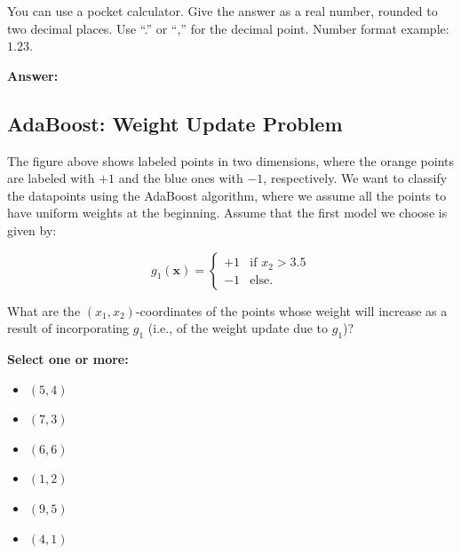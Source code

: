 \documentclass{article}
\begin{document}
You can use a pocket calculator. Give the answer as a real number, rounded to two decimal places. Use ``.'' or ``,'' for the decimal point. Number format example: \(1.23\).

\textbf{Answer:} 

\subsection*{AdaBoost: Weight Update Problem}

\begin{center}
\end{center}

The figure above shows labeled points in two dimensions, where the orange points are labeled with \(+1\) and the blue ones with \(-1\), respectively. We want to classify the datapoints using the AdaBoost algorithm, where we assume all the points to have uniform weights at the beginning. Assume that the first model we choose is given by:

\[
g_1(\mathbf{x}) = 
\begin{cases} 
+1 & \text{if } x_2 > 3.5 \\ 
-1 & \text{else.}
\end{cases}
\]

What are the \((x_1, x_2)\)-coordinates of the points whose weight will increase as a result of incorporating \(g_1\) (i.e., of the weight update due to \(g_1\))?

\textbf{Select one or more:}

\begin{itemize}
    \item \((5, 4)\)
    \item \((7, 3)\)
    \item \((6, 6)\)
    \item \((1, 2)\)
    \item \((9, 5)\)
    \item \((4, 1)\)
\end{itemize}
\end{document}
